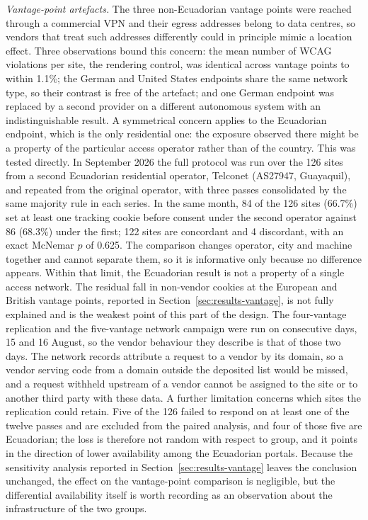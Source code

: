 \documentclass[]{interact}
\begin{document}
\emph{Vantage-point artefacts.} The three non-Ecuadorian vantage points were reached through a commercial VPN and their egress addresses belong to data centres, so vendors that treat such addresses differently could in principle mimic a location effect. Three observations bound this concern: the mean number of WCAG violations per site, the rendering control, was identical across vantage points to within 1.1\%; the German and United States endpoints share the same network type, so their contrast is free of the artefact; and one German endpoint was replaced by a second provider on a different autonomous system with an indistinguishable result. A symmetrical concern applies to the Ecuadorian endpoint, which is the only residential one: the exposure observed there might be a property of the particular access operator rather than of the country. This was tested directly. In September 2026 the full protocol was run over the 126 sites from a second Ecuadorian residential operator, Telconet (AS27947, Guayaquil), and repeated from the original operator, with three passes consolidated by the same majority rule in each series. In the same month, 84 of the 126 sites (66.7\%) set at least one tracking cookie before consent under the second operator against 86 (68.3\%) under the first; 122 sites are concordant and 4 discordant, with an exact McNemar $p$ of 0.625. The comparison changes operator, city and machine together and cannot separate them, so it is informative only because no difference appears. Within that limit, the Ecuadorian result is not a property of a single access network. The residual fall in non-vendor cookies at the European and British vantage points, reported in Section~\ref{sec:results-vantage}, is not fully explained and is the weakest point of this part of the design. The four-vantage replication and the five-vantage network campaign were run on consecutive days, 15 and 16 August, so the vendor behaviour they describe is that of those two days. The network records attribute a request to a vendor by its domain, so a vendor serving code from a domain outside the deposited list would be missed, and a request withheld upstream of a vendor cannot be assigned to the site or to another third party with these data. A further limitation concerns which sites the replication could retain. Five of the 126 failed to respond on at least one of the twelve passes and are excluded from the paired analysis, and four of those five are Ecuadorian; the loss is therefore not random with respect to group, and it points in the direction of lower availability among the Ecuadorian portals. Because the sensitivity analysis reported in Section~\ref{sec:results-vantage} leaves the conclusion unchanged, the effect on the vantage-point comparison is negligible, but the differential availability itself is worth recording as an observation about the infrastructure of the two groups.
\end{document}
